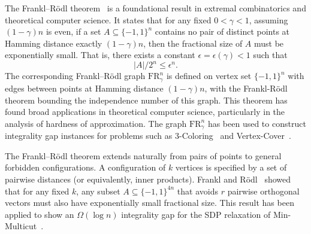 \documentclass[11pt]{article}
\newcommand{\FR}{{\mathrm{FR}_\gamma^n}}
\begin{document}
The Frankl–R\"{o}dl theorem~\cite{frankl1987forbidden} is a foundational result in extremal combinatorics and theoretical computer science. It states that for any fixed \( 0 < \gamma < 1 \), assuming \( (1 - \gamma)n \) is even, if a set \( A \subseteq \{-1,1\}^n \) contains no pair of distinct points at Hamming distance exactly \( (1 - \gamma)n \), then the fractional size of \( A \) must be exponentially small. That is, there exists a constant \( \epsilon = \epsilon(\gamma) < 1 \) such that
\[
|A|/2^{n} \leq \epsilon^n.
\]
The corresponding Frankl–R\"{o}dl graph \( \FR \) is defined on vertex set \( \{-1,1\}^n \) with edges between points at Hamming distance \( (1 - \gamma)n \), with the Frankl-R\"{o}dl theorem bounding the independence number of this graph. This theorem has found broad applications in theoretical computer science, particularly in the analysis of hardness of approximation. The graph \( \FR \) has been used to construct integrality gap instances for problems such as 3-Coloring~\cite{kleinberg1998lovasz, karger1998approximate, charikar2002semidefinite, arora2011new, kauers2014hypercontractive} and Vertex-Cover~\cite{kleinberg1998lovasz, charikar2002semidefinite, arora2006proving, georgiou2008vertex, georgiou2010integrality, kauers2014hypercontractive}.

\smallskip
The Frankl–R\"{o}dl theorem extends naturally from pairs of points to general forbidden configurations. A configuration of \( k \) vertices is specified by a set of pairwise distances (or equivalently, inner products). Frankl and R\"{o}dl~\cite{frankl1987forbidden} showed that for any fixed \( k \), any subset \( A \subseteq \{-1,1\}^{4n} \) that avoids \( r \) pairwise orthogonal vectors must also have exponentially small fractional size. This result has been applied to show an \( \Omega(\log n) \) integrality gap for the SDP relaxation of Min-Multicut~\cite{agarwal2005log}.
\end{document}
